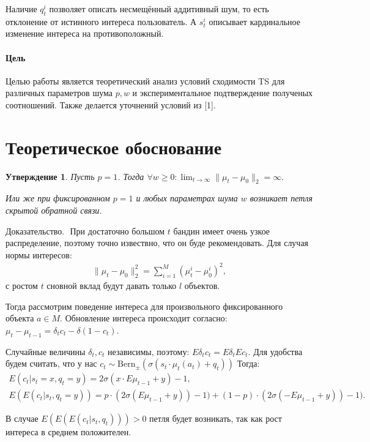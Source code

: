 \documentclass[12pt, twoside]{article}
\newtheorem{statement}{Утверждение}
\begin{document}
Наличие $q_t^i$ позволяет описать несмещённый аддитивный шум, то есть отклонение от истинного интереса пользователь. А $s_t^i$ описывает кардинальное изменение интереса на противоположный. 

\paragraph{Цель}
Целью работы является теоретический анализ условий сходимости TS для различных параметров шума $p, w$ и экспериментальное подтверждение полученых соотношений. 
Также делается уточнений условий из [1]. 

\section{Теоретическое обоснование}
\begin{statement}
  Пусть  $p=1$. Тогда $\forall w \geq 0 : \lim_{t \to \infty} \|\mu_t - \mu_0 \|_2 = \infty.$

  Или же при фиксированном $ p = 1$ и любых параметрах шума $w$ возникает петля скрытой обратной связи. 
\end{statement}
$\textbf{Доказательство. }$ При достаточно большом $t$ бандин имеет очень узкое распределение, поэтому точно извествно, что он буде рекомендовать.
Для случая нормы интересов: 
\begin{gather*}
  \|\mu_t - \mu_0 \|^2_2 = \sum_{i=1}^M (\mu_t^i - \mu_0^i)^2,
\end{gather*}
с ростом $t$ сновной вклад будут давать только $l$ объектов.

Тогда рассмотрим поведение интереса для произвольного фиксированного объекта $a \in M$. 
Обновление интереса происходит согласно: $\mu_t - \mu_{t-1} = \delta_t c_t - \delta (1 - c_t)$.

Случайные величины $\delta_t, c_t$ независимы, поэтому: $E \delta_t c_t = E \delta_t E c_t$. 
Для удобства будем считать, что у нас $c_t \sim \text{Bern}_{\pm}(\sigma(s_t \cdot \mu_t(a_t) + q_t))$
Тогда: 
\begin{gather*}
  E (c_t | s_t = x, q_t = y) = 2 \sigma(x \cdot E \mu_{t-1} + y) - 1, \\
  E (E (c_t | s_t, q_t = y)) = p \cdot (2 \sigma(E \mu_{t-1} + y)) - 1) +  (1-p) \cdot (2 \sigma(- E\mu_{t-1} + y)) - 1).  
\end{gather*}

В случае $E(E(E(c_t|s_t, q_t))) > 0$ петля будет возникать, так как рост интереса в среднем положителен. 
\end{document}

